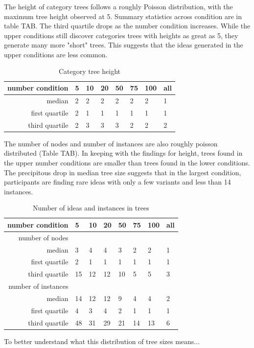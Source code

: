The height of category trees follows a roughly Poisson distribution, with the maximum tree height observed at 5. Summary statistics across condition are in table TAB. The third quartile drops as the number condition increases. While the upper conditions still discover categories trees with heights as great as 5, they generate many more "short" trees. This suggests that the ideas generated in the upper conditions are less common.

\begin{table}
	\begin{tabular}[h!]{r | l l l l l l l}
	\textbf{number condition} & 5 & 10 & 20 & 50 & 75 & 100 & all \\ \hline \hline
	median & 2 & 2 & 2 & 2 & 2 & 2 & 1\\
	first quartile & 2 & 1  & 1 & 1 & 1 & 1 & 1\\
	third quartile & 2 & 3 &3 &3 &2 &2 & 2\\
	\end{tabular}
	\caption{Category tree height}
\end{table}

The number of nodes and number of instances are also roughly poisson distributed (Table TAB). In keeping with the findings for height, trees found in the upper number conditions are smaller than trees found in the lower conditions. The precipitous drop in median tree size suggests that in the largest condition, participants are finding rare ideas with only a few variants and less than 14 instances.

\begin{table}
\begin{tabular}[h!]{r | l l l l l l l}
	\textbf{number condition} & 5 & 10 & 20 & 50 & 75 & 100 & all \\ \hline \hline
	number of nodes& \\ \hline
	median &3&4&4&3&2&2&1 \\
	first quartile &2&1&1&1&1&1&1 \\
	third quartile &15&12&12&10&5&5&3 \\
	number of instances& \\ \hline
	median &14&12&12&9&4&4&2 \\
	first quartile &4&3&4&2&1&1&1 \\
	third quartile &48&31&29&21&14&13&6 \\
	\end{tabular}
	\caption{Number of ideas and instances in trees}
\end{table}

To better understand what this distribution of tree sizes means...